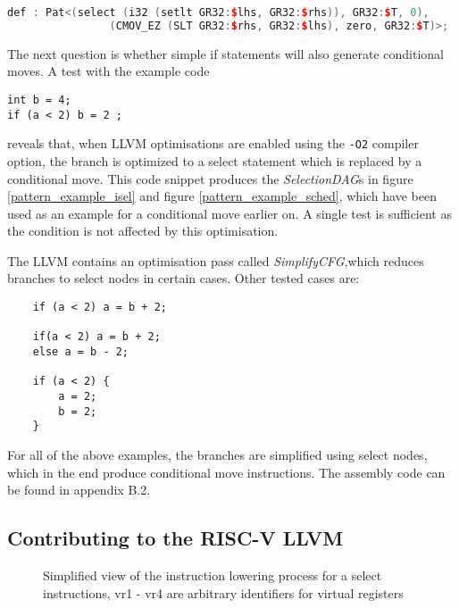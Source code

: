 \documentclass[12pt,twoside,notitlepage]{report}
\begin{document}
\begin{lstlisting}[language=C++, label={cmov_zero_Pattern}, caption={\textit{SelectionDAG} pattern consisting of a select where the second source operand is zero and a set-less-than node; it replacement is a \texttt{cmovez} node and a set-less-than node with swapped operands; extracted from RISCVInstrInfo.td}]
def : Pat<(select (i32 (setlt GR32:$lhs, GR32:$rhs)), GR32:$T, 0),
                (CMOV_EZ (SLT GR32:$rhs, GR32:$lhs), zero, GR32:$T)>;
\end{lstlisting}

The next question is whether simple if statements will also generate conditional moves. A test with the example code
\begin{verbatim}
int b = 4;
if (a < 2) b = 2 ;
\end{verbatim}
reveals that, when LLVM optimisations are enabled using the \texttt{-O2} compiler option, the branch is optimized to a select statement which is replaced by a conditional move. This code snippet produces the \textit{SelectionDAG}s in figure \ref{pattern_example_isel} and figure \ref{pattern_example_sched}, which have been used as an example for a conditional move earlier on. A single test is sufficient as the condition is not affected by this optimisation.

The LLVM contains an optimisation pass called \textit{SimplifyCFG},which reduces branches to select nodes in certain cases. Other tested cases are:
\begin{verbatim}
    if (a < 2) a = b + 2;

    if(a < 2) a = b + 2;
    else a = b - 2;

    if (a < 2) {
        a = 2;
        b = 2;
    }
\end{verbatim}
For all of the above examples, the branches are simplified using select nodes, which in the end produce conditional move instructions. The assembly code can be found in appendix B.2.


\subsection{Contributing to the RISC-V LLVM}

\begin{figure}[h]
\centering
\caption{Simplified view of the instruction lowering process for a select instructions, vr1 - vr4 are arbitrary identifiers for virtual registers}
\end{figure}
\end{document}
